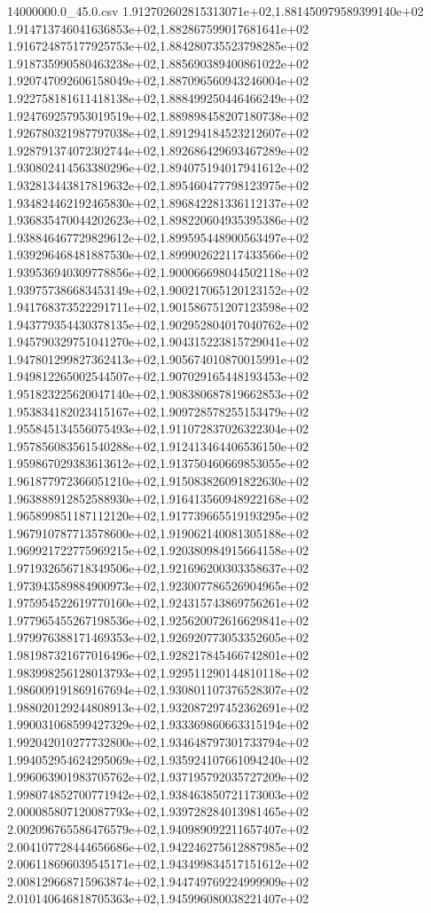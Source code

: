 \begin{filecontents*}{14000000.0_45.0.csv}
1.912702602815313071e+02,1.881450979589399140e+02
1.914713746041636853e+02,1.882867599017681641e+02
1.916724875177925753e+02,1.884280735523798285e+02
1.918735990580463238e+02,1.885690389400861022e+02
1.920747092606158049e+02,1.887096560943246004e+02
1.922758181611418138e+02,1.888499250446466249e+02
1.924769257953019519e+02,1.889898458207180738e+02
1.926780321987797038e+02,1.891294184523212607e+02
1.928791374072302744e+02,1.892686429693467289e+02
1.930802414563380296e+02,1.894075194017941612e+02
1.932813443817819632e+02,1.895460477798123975e+02
1.934824462192465830e+02,1.896842281336112137e+02
1.936835470044202623e+02,1.898220604935395386e+02
1.938846467729829612e+02,1.899595448900563497e+02
1.939296468481887530e+02,1.899902622117433566e+02
1.939536940309778856e+02,1.900066698044502118e+02
1.939757386683453149e+02,1.900217065120123152e+02
1.941768373522291711e+02,1.901586751207123598e+02
1.943779354430378135e+02,1.902952804017040762e+02
1.945790329751041270e+02,1.904315223815729041e+02
1.947801299827362413e+02,1.905674010870015991e+02
1.949812265002544507e+02,1.907029165448193453e+02
1.951823225620047140e+02,1.908380687819662853e+02
1.953834182023415167e+02,1.909728578255153479e+02
1.955845134556075493e+02,1.911072837026322304e+02
1.957856083561540288e+02,1.912413464406536150e+02
1.959867029383613612e+02,1.913750460669853055e+02
1.961877972366051210e+02,1.915083826091822630e+02
1.963888912852588930e+02,1.916413560948922168e+02
1.965899851187112120e+02,1.917739665519193295e+02
1.967910787713578600e+02,1.919062140081305188e+02
1.969921722775969215e+02,1.920380984915664158e+02
1.971932656718349506e+02,1.921696200303358637e+02
1.973943589884900973e+02,1.923007786526904965e+02
1.975954522619770160e+02,1.924315743869756261e+02
1.977965455267198536e+02,1.925620072616629841e+02
1.979976388171469353e+02,1.926920773053352605e+02
1.981987321677016496e+02,1.928217845466742801e+02
1.983998256128013793e+02,1.929511290144810118e+02
1.986009191869167694e+02,1.930801107376528307e+02
1.988020129244808913e+02,1.932087297452362691e+02
1.990031068599427329e+02,1.933369860663315194e+02
1.992042010277732800e+02,1.934648797301733794e+02
1.994052954624295069e+02,1.935924107661094240e+02
1.996063901983705762e+02,1.937195792035727209e+02
1.998074852700771942e+02,1.938463850721173003e+02
2.000085807120087793e+02,1.939728284013981465e+02
2.002096765586476579e+02,1.940989092211657407e+02
2.004107728444656686e+02,1.942246275612887985e+02
2.006118696039545171e+02,1.943499834517151612e+02
2.008129668715963874e+02,1.944749769224999909e+02
2.010140646818705363e+02,1.945996080038221407e+02

\end{filecontents*}
